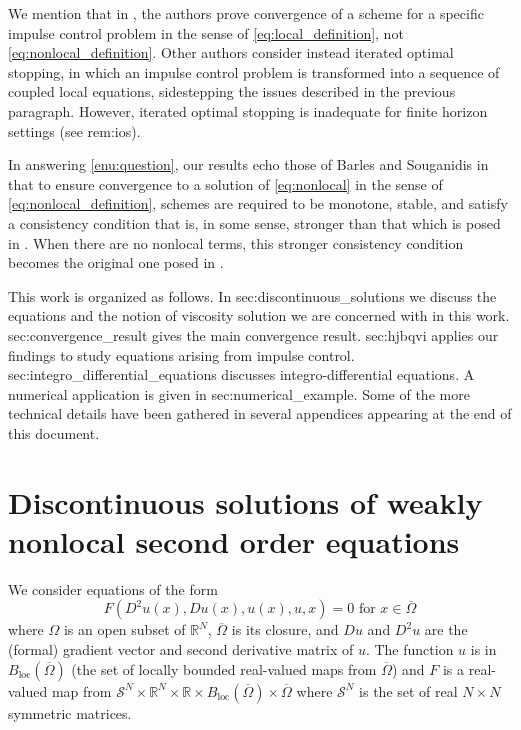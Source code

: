 \documentclass[12pt]{article}
\begin{document}
We mention that in \cite{MR2422079}, the authors prove convergence of a scheme for a specific impulse control problem in the sense of \eqref{eq:local_definition}, not \eqref{eq:nonlocal_definition}.
Other authors \cite{MR2314777,seydel2009impulse} consider instead
iterated optimal stopping, in which an impulse control problem is
transformed into a sequence of coupled local equations, sidestepping
the issues described in the previous paragraph.
However, iterated optimal stopping is
inadequate for finite horizon settings (see {\prettyref}{rem:ios}).

In answering \ref{enu:question}, our results echo those of Barles
and Souganidis in that to ensure convergence to a solution of \eqref{eq:nonlocal}
in the sense of \eqref{eq:nonlocal_definition}, schemes are required
to be monotone, stable, and satisfy a consistency condition that is,
in some sense, stronger than that which is posed in \cite{MR1115933}.
When there are no nonlocal terms, this stronger consistency condition
becomes the original one posed in \cite{MR1115933}.

This work is organized as follows. In {\prettyref}{sec:discontinuous_solutions}
we discuss the equations and the notion of viscosity solution we are
concerned with in this work. {\prettyref}{sec:convergence_result} gives
the main convergence result. {\prettyref}{sec:hjbqvi} applies our findings
to study equations arising from impulse control. {\prettyref}{sec:integro_differential_equations}
discusses integro-differential equations. A numerical application
is given in {\prettyref}{sec:numerical_example}. Some of the more technical details have been gathered in several appendices
appearing at the end of this document.

\section{\label{sec:discontinuous_solutions}Discontinuous solutions of weakly
nonlocal second order equations}

We consider equations of the form
\begin{equation}
F(D^{2}u(x),Du(x),u(x),u,x)=0\text{ for }x\in\overline{\Omega}\label{eq:pde}
\end{equation}
where $\Omega$ is an open subset of $\mathbb{R}^{N}$, $\overline{\Omega}$
is its closure, and $Du$ and $D^{2}u$ are the (formal) gradient
vector and second derivative matrix of $u$. The function $u$ is
in $B_{\operatorname{loc}}(\overline{\Omega})$ (the set of locally bounded real-valued
maps from $\overline{\Omega}$) and $F$ is a real-valued map from
$\mathcal{S}^{N}\times\mathbb{R}^{N}\times\mathbb{R}\times B_{\operatorname{loc}}(\overline{\Omega})\times\overline{\Omega}$
where $\mathcal{S}^{N}$ is the set of real $N\times N$ symmetric
matrices.
\end{document}
